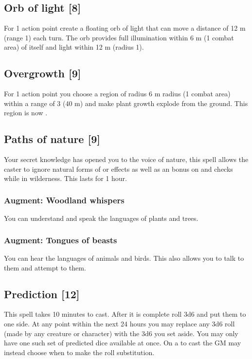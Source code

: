 \subsection{Orb of light [8]}
\label{spell:orb-light}
For 1 action point create a floating orb of light that can move a distance of 12 m (range 1) each turn. The orb provides full illumination within 6 m (1 combat area) of itself and  light within 12 m (radius 1).


\subsection{Overgrowth [9]}
\label{spell:overgrowth}
For 1 action point you choose a region of radius 6 m radius (1 combat area) within a range of 3 (40 m) and make plant growth explode from the ground. This region is now .


\subsection{Paths of nature [9]}
Your secret knowledge has opened you to the voice of nature, this spell allows the caster to ignore natural forms of  or  effects as well as an  bonus on  and  checks while in wilderness. This lasts for 1 hour.
\subsubsection{Augment: Woodland whispers}
You can understand and speak the languages of plants and trees.
\subsubsection{Augment: Tongues of beasts}
You can hear the languages of animals and birds. This also allows you to talk to them and attempt to  them.


\subsection{Prediction [12]}
This spell takes 10 minutes to cast. After it is complete roll 3d6 and put them to one side. At any point within the next 24 hours you may replace any 3d6 roll (made by any creature or character) with the 3d6 you set aside. You may only have one such set of predicted dice available at once. On a  to cast the GM may instead choose when to make the roll substitution.
